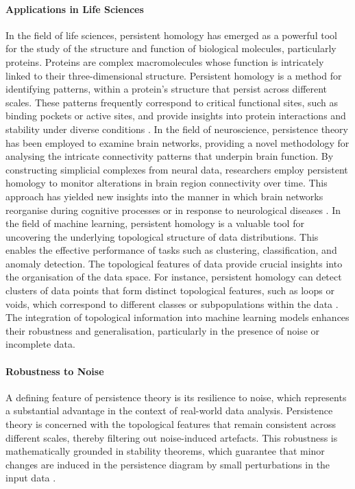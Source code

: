 \paragraph*{Applications in Life Sciences}
In the field of life sciences, persistent homology has emerged as a powerful tool for the study of the structure and function of biological molecules, particularly proteins. Proteins are complex macromolecules whose function is intricately linked to their three-dimensional structure. Persistent homology is a method for identifying patterns, within a protein's structure that persist across different scales. These patterns frequently correspond to critical functional sites, such as binding pockets or active sites, and provide insights into protein interactions and stability under diverse conditions \cite{Kovacev-Nikolic2016}. In the field of neuroscience, persistence theory has been employed to examine brain networks, providing a novel methodology for analysing the intricate connectivity patterns that underpin brain function. By constructing simplicial complexes from neural data, researchers employ persistent homology to monitor alterations in brain region connectivity over time. This approach has yielded new insights into the manner in which brain networks reorganise during cognitive processes or in response to neurological diseases \cite{Giusti2016}. In the field of machine learning, persistent homology is a valuable tool for uncovering the underlying topological structure of data distributions. This enables the effective performance of tasks such as clustering, classification, and anomaly detection. The topological features of data provide crucial insights into the organisation of the data space. For instance, persistent homology can detect clusters of data points that form distinct topological features, such as loops or voids, which correspond to different classes or subpopulations within the data \cite{Hofer2017,melodia2018deep,melodia2020persistent,melodia2021estimate,melodia2021homological}. The integration of topological information into machine learning models enhances their robustness and generalisation, particularly in the presence of noise or incomplete data.

\paragraph*{Robustness to Noise}
A defining feature of persistence theory is its resilience to noise, which represents a substantial advantage in the context of real-world data analysis. Persistence theory is concerned with the topological features that remain consistent across different scales, thereby filtering out noise-induced artefacts. This robustness is mathematically grounded in stability theorems, which guarantee that minor changes are induced in the persistence diagram by small perturbations in the input data \cite{Cohen-Steiner2007}.


